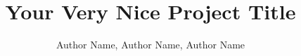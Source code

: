 \documentclass[sigplan,screen,10pt]{acmart}
\begin{document}
\title{Your Very Nice Project Title}

\author{Author Name, Author Name, Author Name}



\maketitle










\end{document}
